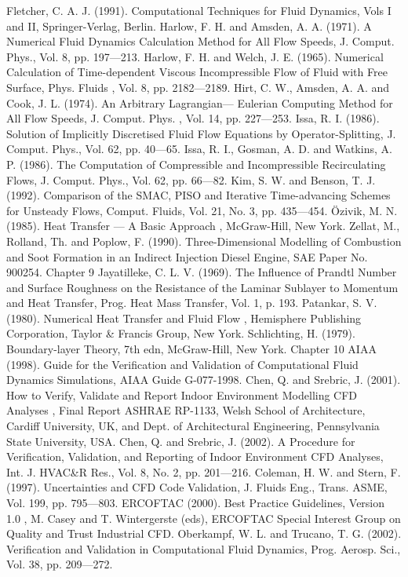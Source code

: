 \documentclass[11pt,a4paper,openany,fontset=none]{ctexbook}
\begin{document}
\begin{sloppypar}
{\small Fletcher, C. A. J. (1991). Computational Techniques for Fluid Dynamics, Vols I and II, Springer-Verlag, Berlin. Harlow, F. H. and Amsden, A. A. (1971). A Numerical Fluid Dynamics Calculation Method for All Flow Speeds, J. Comput. Phys., Vol. 8, pp. 197—213. Harlow, F. H. and Welch, J. E. (1965). Numerical Calculation of Time-dependent Viscous Incompressible Flow of Fluid with Free Surface, Phys. Fluids , Vol. 8, pp. 2182—2189. Hirt, C. W., Amsden, A. A. and Cook, J. L. (1974). An Arbitrary Lagrangian— Eulerian Computing Method for All Flow Speeds, J. Comput. Phys. , Vol. 14, pp. 227—253. Issa, R. I. (1986). Solution of Implicitly Discretised Fluid Flow Equations by Operator-Splitting, J. Comput. Phys., Vol. 62, pp. 40—65. Issa, R. I., Gosman, A. D. and Watkins, A. P. (1986). The Computation of Compressible and Incompressible Recirculating Flows, J. Comput. Phys., Vol. 62, pp. 66—82. Kim, S. W. and Benson, T. J. (1992). Comparison of the SMAC, PISO and Iterative Time-advancing Schemes for Unsteady Flows, Comput. Fluids, Vol. 21, No. 3, pp. 435—454. Özivik, M. N. (1985). Heat Transfer — A Basic Approach , McGraw-Hill, New York. Zellat, M., Rolland, Th. and Poplow, F. (1990). Three-Dimensional Modelling of Combustion and Soot Formation in an Indirect Injection Diesel Engine, SAE Paper No. 900254. Chapter 9 Jayatilleke, C. L. V. (1969). The Influence of Prandtl Number and Surface Roughness on the Resistance of the Laminar Sublayer to Momentum and Heat Transfer, Prog. Heat Mass Transfer, Vol. 1, p. 193. Patankar, S. V. (1980). Numerical Heat Transfer and Fluid Flow , Hemisphere Publishing Corporation, Taylor \& Francis Group, New York. Schlichting, H. (1979). Boundary-layer Theory, 7th edn, McGraw-Hill, New York. Chapter 10 AIAA (1998). Guide for the Verification and Validation of Computational Fluid Dynamics Simulations, AIAA Guide G-077-1998. Chen, Q. and Srebric, J. (2001). How to Verify, Validate and Report Indoor Environment Modelling CFD Analyses , Final Report ASHRAE RP-1133, Welsh School of Architecture, Cardiff University, UK, and Dept. of Architectural Engineering, Pennsylvania State University, USA. Chen, Q. and Srebric, J. (2002). A Procedure for Verification, Validation, and Reporting of Indoor Environment CFD Analyses, Int. J. HVAC\&R Res., Vol. 8, No. 2, pp. 201—216. Coleman, H. W. and Stern, F. (1997). Uncertainties and CFD Code Validation, J. Fluids Eng., Trans. ASME, Vol. 199, pp. 795—803. ERCOFTAC (2000). Best Practice Guidelines, Version 1.0 , M. Casey and T. Wintergerste (eds), ERCOFTAC Special Interest Group on Quality and Trust Industrial CFD. Oberkampf, W. L. and Trucano, T. G. (2002). Verification and Validation in Computational Fluid Dynamics, Prog. Aerosp. Sci., Vol. 38, pp. 209—272.}\par

\end{sloppypar}
\end{document}

